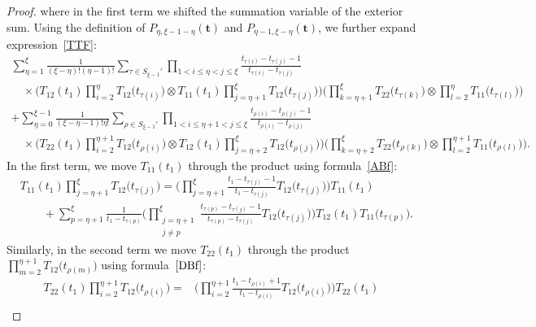 \documentclass[pdftex]{sigma}
\numberwithin{equation}{section}
\begin{document}
\begin{proof}
\pagebreak

\noindent
where in the first term we shifted the summation variable of the exterior sum.
Using the definition of $P_{\eta,\xi-1-\eta}(\boldsymbol{t}) $ and $P_{\eta-1,\xi-\eta}(\boldsymbol{t}) $, we further expand expression~\eqref{TTF}:
\begin{gather*}
\sum_{\eta=1}^{\xi} \frac{1}{(\xi-\eta)!(\eta-1)! } \sum_{\tau\in S_{\xi-1}'} \prod_{1< i\leq\eta<j \leq \xi} \frac{t_{\tau(i)}-t_{\tau(j)}-1}{t_{\tau(i)}-t_{\tau(j)}} \\[1mm]
\quad\times \Biggl(T_{12}(t_1) \prod_{i=2}^{\eta} T_{12} \bigl(t_{\tau(i)}\bigr) \otimes T_{11}(t_1)\prod_{j=\eta+1}^{\xi} T_{12} \bigl(t_{\tau(j)}\bigr) \Biggr) \Biggl(\prod_{k=\eta+1}^{\xi } T _{22}\bigl(t_{\tau(k)}\bigr)\otimes \prod_{l=2}^{\eta} T _{11}\bigl(t_{\tau(l)}\bigr)\Biggr) \\[1mm]
 + \sum_{\eta=0}^{\xi-1} \frac{1}{(\xi-\eta-1) ! \eta!} \sum_{\rho\in S_{\xi-1}'} \prod_{1< i\leq\eta+1<j \leq \xi} \frac{t_{\rho(i)}-t_{\rho(j)}-1}{t_{\rho(i)}-t_{\rho(j)}} \\[1mm]
\quad\times \Biggl(T_{22}(t_1) \prod_{i=2}^{\eta+1} T_{12} \bigl(t_{\rho(i)}\bigr) \otimes T_{12}(t_1)\prod_{j=\eta+2}^{\xi } T_{12} \bigl(t_{\rho(j)}\bigr) \Biggr)
\Biggl(\prod_{k=\eta+2}^{\xi } T _{22}\bigl(t_{\rho(k)}\bigr)\otimes \prod_{l=2}^{\eta+1} T _{11}\bigl(t_{\rho(l)}\bigr)\Biggr).
\end{gather*}
In the first term, we move $T_{11}(t_1)$ through the product  using formula~\eqref{ABf}:
\begin{align*}
&T_{11} (t_1)\prod_{j=\eta+1}^{\xi } T_{12} \bigl(t_{\tau(j)}\bigr)=\Biggl( \prod_{j=\eta+1}^{\xi } \frac{t_1-t_{\tau(j)}-1}{t_1-t_{\tau(j)}} T_{12} \bigl(t_{\tau(j)}\bigr)\Biggr) T_{11} (t_1) \\[1mm]
&\qquad{}+\sum_{p=\eta+1}^\xi \frac{1}{t_1-t_{\tau(p)}}\Biggl( \prod_{\substack{j=\eta+1\\j\neq p}}^\xi \frac{t_{\tau(p)}-t_{\tau(j)}-1}{t_{\tau(p)}-t_{\tau(j)}} T_{12} \bigl(t_{\tau(j)}\bigr)\Biggr) T_{12} (t_1)T_{11} \bigl(t_{\tau(p)}\bigr).
\end{align*}
Similarly, in the second term we move $T_{22}(t_1)$ through the product $\prod_{m=2}^{\eta+1} T_{12} \bigl(t_{\rho(m)}\bigr)$ using formula~$\eqref{DBf}$:
\begin{align*}
T_{22} (t_1)\prod_{i=2}^{\eta+1 } T_{12} \bigl(t_{\rho(i)}\bigr)={}&\Biggl( \prod_{i=2}^{\eta+1}\frac{t_1-t_{\rho(i)}+1}{t_1-t_{\rho(i)}} T_{12} \bigl(t_{\rho(i)}\bigr)\Biggr) T_{22} (t_1)\\[1mm]

\end{align*}
\end{proof}
\end{document}
